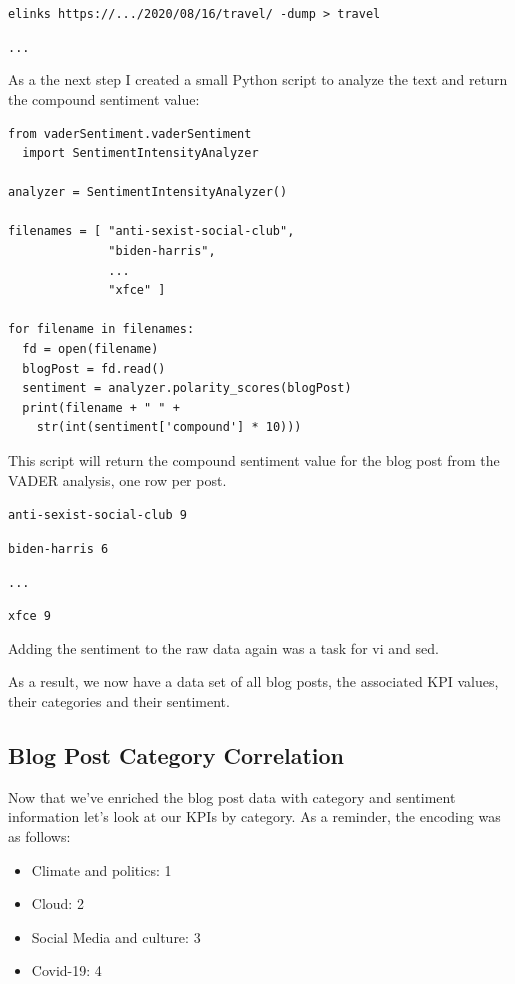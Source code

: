 \verb|elinks https://.../2020/08/16/travel/ -dump > travel|

\verb|...|

As a the next step I created a small Python script to analyze the text and return the compound sentiment value:

\begin{lstlisting}[caption=Vader Sentiment Compound, frame=single, basicstyle=\ttfamily]
from vaderSentiment.vaderSentiment 
  import SentimentIntensityAnalyzer

analyzer = SentimentIntensityAnalyzer()

filenames = [ "anti-sexist-social-club",
              "biden-harris",
              ...
              "xfce" ]

for filename in filenames:
  fd = open(filename)
  blogPost = fd.read()
  sentiment = analyzer.polarity_scores(blogPost)
  print(filename + " " + 
    str(int(sentiment['compound'] * 10)))

\end{lstlisting}

This script will return the compound sentiment value for the blog post from the VADER analysis, one row per post.

\verb|anti-sexist-social-club 9|

\verb|biden-harris 6|

\verb|...|

\verb|xfce 9|

Adding the sentiment to the raw data again was a task for vi and sed.

As a result, we now have a data set of all blog posts, the associated KPI values, their categories and their sentiment.

\subsection{Blog Post Category Correlation}

Now that we've enriched the blog post data with category and sentiment information let's look at our KPIs by category. As a reminder, the encoding was as follows:

\begin{itemize}
\item Climate and politics: 1
\item Cloud: 2
\item Social Media and culture: 3
\item Covid-19: 4
\end{itemize}

